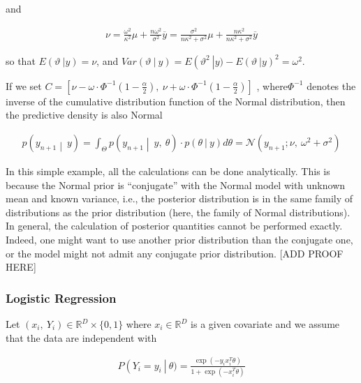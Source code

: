 \documentclass[11pt,a4paper]{article}
\begin{document}
and

\begin{align}\nu = \frac{\omega^{2}}{\kappa^{2}}\mu + \frac{n\omega^{2}}{\sigma^{2}}\overline{y} = \frac{\sigma^{2}}{n\kappa^{2} + \sigma^{2}}\mu + \frac{n\kappa^{2}}{n\kappa^{2} + \sigma^{2}}\overline{y}\end{align}

so that \(E(\vartheta\ |y) = \nu\), and
\(Var(\vartheta\ |\ y) = E\left( \vartheta^{2}\  \right|y) - {E(\vartheta\ |y)}^{2} = \omega^{2}\).

If we set
\(C = [\nu - \omega \cdot \Phi^{- 1}\left( 1 - \frac{\alpha}{2} \right),\ \nu + \omega \cdot \Phi^{- 1}\left( 1 - \frac{\alpha}{2} \right)]\)
, where\(\Phi^{- 1}\) denotes the inverse of the cumulative distribution
function of the Normal distribution, then the predictive density is also
Normal

\begin{align}p\left( y_{n + 1} \middle| \ y \right) = \int_{\Theta}^{}{p\left( y_{n + 1} \middle| \ y,\ \theta \right) \cdot p(\theta\ |\ y)}d\theta = \mathcal{N}\left( y_{n + 1};\nu,\ \omega^{2} + \sigma^{2} \right)\end{align}

In this simple example, all the calculations can be done analytically.
This is because the Normal prior is ``conjugate'' with the Normal model
with unknown mean and known variance, i.e., the posterior distribution
is in the same family of distributions as the prior distribution (here,
the family of Normal distributions). In general, the calculation of
posterior quantities cannot be performed exactly. Indeed, one might want
to use another prior distribution than the conjugate one, or the model
might not admit any conjugate prior distribution. {[}ADD PROOF HERE{]}

\subsubsection{Logistic Regression}\label{logistic-regression}

Let \(\left( x_{i},\ Y_{i} \right) \in \mathbb{R}^{D} \times \{ 0,1\}\)
where \(x_{i} \in \mathbb{R}^{D}\) is a given covariate and we assume
that the data are independent with

\begin{align}P\left( Y_{i} = y_{i}\  \right|\ \theta) = \frac{\exp\left( - y_{i}x_{i}^{T}\theta \right)}{1 + \exp\left( - x_{i}^{T}\theta \right)}\end{align}
\end{document}
